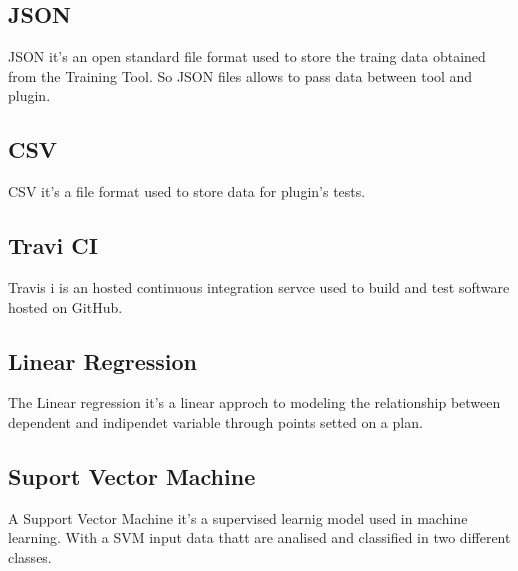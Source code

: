 \subsection{JSON}
JSON it's an open standard file format used to store the traing data obtained from the Training Tool. So JSON files allows to pass data between tool and plugin.

\subsection{CSV}
CSV it's a file format used to store data for plugin's tests.

\subsection{Travi CI}
Travis i is an hosted continuous integration servce used to build and test software hosted on GitHub.

\subsection{Linear Regression}
The Linear regression it's a linear approch to modeling the relationship between dependent and indipendet variable through points setted on a plan.

\subsection{Suport Vector Machine}
A Support Vector Machine it's a supervised learnig model used in machine learning. With a SVM input data thatt are analised  and classified in two different classes.
 